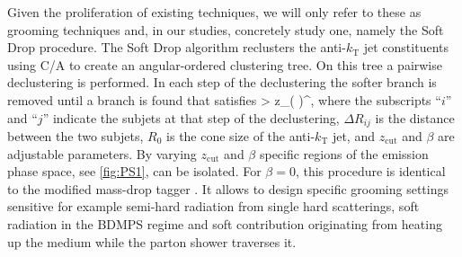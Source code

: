 Given the proliferation of existing techniques, we will only refer to these as grooming techniques and, in our studies, concretely study one, namely the Soft Drop procedure.
The Soft Drop algorithm reclusters the anti-$k_{\mathrm{T}}$ jet constituents using C/A to create an angular-ordered clustering tree. On this tree a pairwise declustering is performed. In each step of the declustering the softer branch is removed until a branch is found that satisfies
\beq
\label{eq:groompar}
 > z_{}\left(  \right)^{\beta},
\eeq
where the subscripts ``$i$'' and ``$j$'' indicate the subjets at that step of the declustering, $\Delta R_{ij}$ is the distance between the two subjets, $R_{0}$ is the cone size of the anti-$k_{\mathrm{T}}$ jet, and $z_{\text{cut}}$ and $\beta$ are adjustable parameters. By varying $z_{\text{cut}}$ and $\beta$ specific regions of the emission phase space, see \autoref{fig:PS1}, can be isolated. For $\beta = 0$, this procedure is identical to the modified mass-drop tagger \cite{Dasgupta:2013ihk}. It allows to design specific grooming settings sensitive for example semi-hard radiation from single hard scatterings, soft radiation in the BDMPS regime and soft contribution originating from heating up the medium while the parton shower traverses it.

